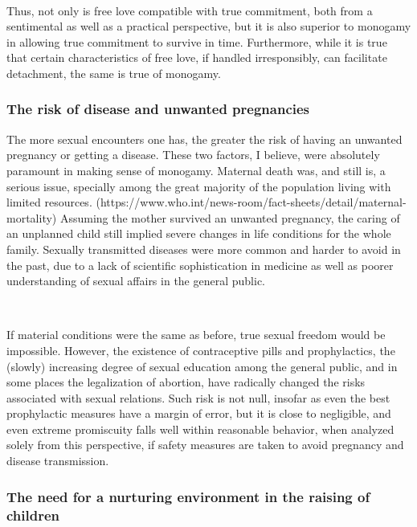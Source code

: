 \documentclass[a4paper, 12pt]{article}
\begin{document}
~

Thus, not only is free love compatible with true commitment, both from a
sentimental as well as a practical perspective, but it is also superior to
monogamy in allowing true commitment to survive in time. Furthermore, while it
is true that certain characteristics of free love, if handled irresponsibly,
can facilitate detachment, the same is true of monogamy. 

\subsubsection{The risk of disease and unwanted pregnancies}

The more sexual encounters one has, the greater the risk of having an unwanted
pregnancy or getting a disease. These two factors, I believe, were absolutely
paramount in making sense of monogamy. Maternal death was, and still is, a
serious issue, specially among the great majority of the
population living with limited resources.
(https://www.who.int/news-room/fact-sheets/detail/maternal-mortality) Assuming
the mother survived an unwanted pregnancy, the caring of an unplanned child
still implied severe changes in life conditions for the whole family. Sexually
transmitted diseases were more common and harder to avoid in the past, due to a 
lack of scientific sophistication in medicine as well as poorer understanding of 
sexual affairs in the general public.

~ 

If material conditions were the same as before, true sexual freedom would be
impossible. However, the existence of contraceptive pills and prophylactics,
the (slowly) increasing degree of sexual education among the general public,
and in some places the legalization of abortion, have radically changed the
risks associated with sexual relations. Such risk is not null, insofar as even
the best prophylactic measures have a margin of error, but it is close to
negligible, and even extreme promiscuity falls well within reasonable behavior,
when analyzed solely from this perspective, if safety measures are taken to
avoid pregnancy and disease transmission.

\subsubsection{The need for a nurturing environment in the raising of children}
\end{document}
